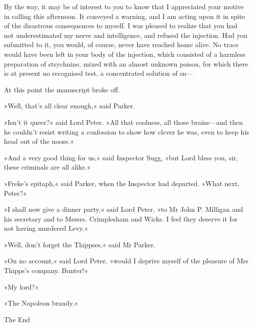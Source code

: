 By the way, it may be of interest to you to know that I appreciated your motive in calling this afternoon. It conveyed a warning, and I am acting upon it in spite of the disastrous consequences to myself. I was pleased to realize that you had not underestimated my nerve and intelligence, and refused the injection. Had you submitted to it, you would, of course, never have reached home alive. No trace would have been left in your body of the injection, which consisted of a harmless preparation of strychnine, mixed with an almost unknown poison, for which there is at present no recognised test, a concentrated solution of sn—

At this point the manuscript broke off.

»Well, that's all clear enough,« said Parker.

»Isn't it queer?« said Lord Peter. »All that coolness, all those brains—and then he couldn't resist writing a confession to show how clever he was, even to keep his head out of the noose.«

»And a very good thing for us,« said Inspector Sugg, »but Lord bless you, sir, these criminals are all alike.«

»Freke's epitaph,« said Parker, when the Inspector had departed. »What next, Peter?«

»I shall now give a dinner party,« said Lord Peter, »to Mr John P. Milligan and his secretary and to Messrs. Crimplesham and Wicks. I feel they deserve it for not having murdered Levy.«

»Well, don't forget the Thippses,« said Mr Parker.

»On no account,« said Lord Peter, »would I deprive myself of the pleasure of Mrs Thipps's company. Bunter!«

»My lord?«

»The Napoleon brandy.«

\begin{center}\mytitlefont\reasonablyhuge
	The End
\end{center}